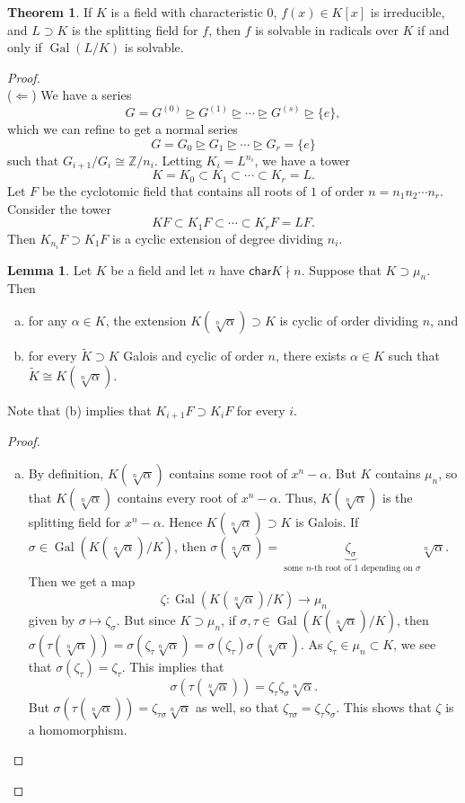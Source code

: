 \documentclass[10pt,letterpaper,cm]{nupset}
\theoremstyle{definition}
\newtheorem{theorem}{Theorem}
\newtheorem{lemma}{Lemma}
\newcommand{\Z}{\mathbb Z}
\newcommand{\1}{\mathbf{1}}
\newcommand{\0}{\vec 0}
\newcommand{\Char}{\mathsf{char}}
\DeclareMathOperator{\gal}{Gal}
\begin{document}
\begin{theorem}
If $K$ is a field with characteristic $0$, $f(x) \in K[x]$ is irreducible, and $L \supset K$ is the splitting field for $f$, then  $f$ is solvable in radicals over $K$ if and only if $\gal(L/K)$ is solvable. 
\end{theorem}
\begin{proof} $ $
\\
($\Longleftarrow$) We have a series $$ G = G^{(0)} \unrhd G^{(1)} \unrhd \cdots \unrhd G^{(s)} \unrhd \{e\} ,$$ which we can refine to get a normal series $$  G=G_0 \unrhd G_1 \unrhd \cdots \unrhd G_r = \{e\}  $$ such that $G_{i+1}/G_i \cong \Z/n_i$. Letting $K_i = L^{n_i}$, we have a tower $$ K= K_0 \subset K_1 \subset \cdots \subset K_r = L  .$$ Let $F$ be the cyclotomic field that contains all roots of $1$ of order $n= n_1n_2 \cdots n_r$. Consider the tower $$KF \subset K_1F \subset \cdots \subset K_r F = LF.$$  Then $K_{n_i}F \supset K_1F$ is a cyclic extension of degree dividing $n_i$.
\begin{lemma}
Let $K$ be a field and let $n$ have $\Char{K} \nmid n$. Suppose that $K \supset \mu_n$. Then
\begin{enumerate}[(a)]
\item for any $\alpha \in K$, the extension $K(\sqrt[n]{\alpha}) \supset K$  is cyclic of order dividing $n$, and
\item for every $\widetilde{K} \supset K$ Galois and cyclic of order $n$, there exists $\alpha \in K$ such that $\widetilde{K} \cong K(\sqrt[n]{\alpha})$.
\end{enumerate}
Note that (b) implies that $K_{i+1}F \supset K_iF$ for every $i$.
\end{lemma}
\begin{proof} $ $
\begin{enumerate}[(a)]
\item By definition, $K(\sqrt[n]{\alpha})$ contains some root of $x^n - \alpha$. But $K$ contains $\mu_n$, so that $K(\sqrt[n]{\alpha})$ contains every root of $x^n - \alpha$. Thus, $K(\sqrt[n]{\alpha})$ is the splitting field for $x^n - \alpha$. Hence $K(\sqrt[n]{\alpha}) \supset K$ is Galois.
 If $\sigma \in \gal(K(\sqrt[n]{\alpha}) / K)$, then $ \sigma(\sqrt[n]{\alpha}) = \underbrace{\zeta_{\sigma}}_{\text{ some } n\text{-th root of 1 depending on } \sigma} \sqrt[n]{\alpha}$. Then we get a map $$\zeta : \gal(K(\sqrt[n]{\alpha})/K) \to \mu_n$$ given by $ \sigma \mapsto \zeta_{\sigma}$. But since $K \supset \mu_n$, if $\sigma, \tau \in \gal(K(\sqrt[n]{\alpha})/K)$, then $\sigma(\tau(\sqrt[n]{\alpha})) = \sigma(\zeta_{\tau}\sqrt[n]{\alpha})= \sigma(\zeta_{\tau})\sigma(\sqrt[n]{\alpha})$. As $\zeta_{\tau} \in \mu_n \subset K$, we see that $\sigma(\zeta_{\tau}) = \zeta_{\tau}$. This implies that $$ \sigma(\tau(\sqrt[n]{\alpha})) =  \zeta_{\tau}\zeta_{\sigma}\sqrt[n]{\alpha} .$$ But $\sigma(\tau(\sqrt[n]{\alpha})) = \zeta_{\tau \sigma}\sqrt[n]{\alpha}$ as well, so that $\zeta_{\tau \sigma} = \zeta_{\tau} \zeta_{\sigma}$. This shows that $\zeta$ is a homomorphism. 
 

\end{enumerate}
\end{proof}
\end{proof}
\end{document}
